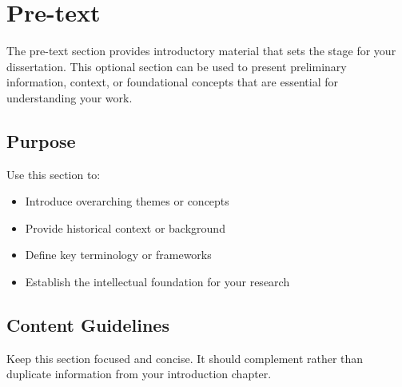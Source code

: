 \chapter*{Pre-text}

The pre-text section provides introductory material that sets the stage for your dissertation. This optional section can be used to present preliminary information, context, or foundational concepts that are essential for understanding your work.

\section*{Purpose}

Use this section to:
\begin{itemize}
\item Introduce overarching themes or concepts
\item Provide historical context or background
\item Define key terminology or frameworks
\item Establish the intellectual foundation for your research
\end{itemize}

\section*{Content Guidelines}

Keep this section focused and concise. It should complement rather than duplicate information from your introduction chapter.

\newpage